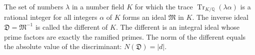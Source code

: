 The set of numbers $\lambda$ in a number field $K$ for which the trace $\operatorname{Tr}_{K/\mathbb{Q}}(\lambda\alpha)$ is a rational integer for all integers $\alpha$ of $K$ forms an ideal $\mathfrak{M}$ in $K$. The inverse ideal $\mathfrak{D} = \mathfrak{M}^{-1}$ is called the different of $K$. The different is an integral ideal whose prime factors are exactly the ramified primes. The norm of the different equals the absolute value of the discriminant: $N(\mathfrak{D}) = |d|$.
